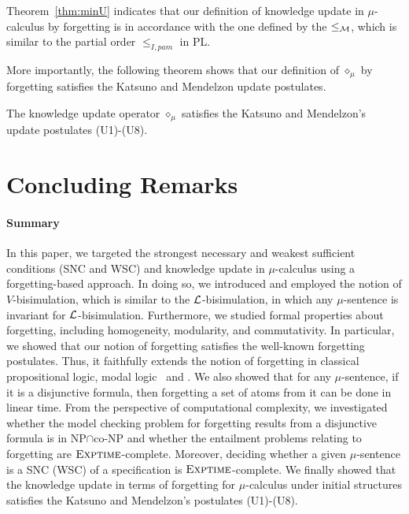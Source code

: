 \documentclass[runningheads]{llncs}
\begin{document}
Theorem~\ref{thm:minU} indicates that our definition of knowledge update in $\mu$-calculus by forgetting is in accordance with the one defined by the $\leq_{{\cal M}}$, which is similar to the partial order $\leq_{I, pam}$ in PL.

More importantly, the following theorem shows that our definition of $\diamond_{\mu}$ by forgetting satisfies the Katsuno and Mendelzon update postulates.
\begin{theorem}\label{thm:U1toU8}
The knowledge update operator $\diamond_{\mu}$ satisfies the Katsuno and Mendelzon's update postulates (U1)-(U8).
\end{theorem}


\section{Concluding Remarks}\label{sec:conclude}
\paragraph{Summary}
In this paper, we targeted the strongest necessary and weakest sufficient conditions (SNC and WSC) and knowledge update in $\mu$-calculus using a forgetting-based approach.
In doing so, we introduced and employed the notion of $V$-bisimulation, which is similar to the ${\cal L}$-bisimulation, in which any $\mu$-sentence is invariant for ${\cal L}$-bisimulation.
Furthermore, we studied formal properties about forgetting, including homogeneity, modularity, and commutativity.
In particular, we showed that our notion of forgetting satisfies the well-known forgetting postulates. Thus, it faithfully extends the notion of forgetting in classical propositional logic, modal logic \SFive\  and \CTL.
We also showed that for any $\mu$-sentence, if it is a disjunctive formula, then forgetting a set  of atoms from it can be done in linear time.
From the perspective of computational complexity,
we investigated whether the model checking problem for forgetting results  from a disjunctive formula is in \textsc{NP}$\cap$co-\textsc{NP}
and whether the entailment problems relating to forgetting are $\textsc{Exptime}$-complete. %
Moreover, deciding whether a given $\mu$-sentence is a SNC (WSC) of a specification is $\textsc{Exptime}$-complete.
We finally showed that the knowledge update in terms of forgetting  for $\mu$-calculus
under initial structures satisfies the Katsuno and Mendelzon's postulates (U1)-(U8).
\end{document}
